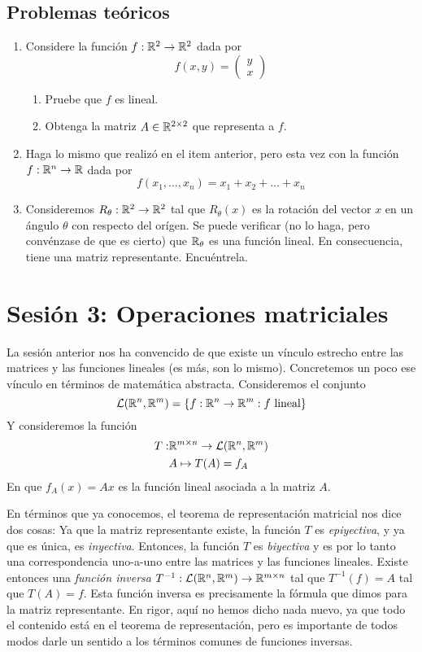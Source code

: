 \subsection{Problemas teóricos}

\begin{enumerate}
    \item Considere la función $f: \mathbb{R}^2 \to \mathbb{R}^2$ dada por
    \[f(x, y) = \begin{pmatrix}
        y \\ x
    \end{pmatrix}\]
    \begin{enumerate}
        \item Pruebe que $f$ es lineal.
        \item Obtenga la matriz $A \in \mathbb{R}^{2 \times 2}$ que representa a $f$.
    \end{enumerate}
    \item Haga lo mismo que realizó en el item anterior, pero esta vez con la función $f: \mathbb{R}^n \to \mathbb{R}$ dada por
    \[f(x_1, \dots , x_n) = x_1 + x_2 + \dots + x_n\]
    \item Consideremos $R_\theta : \mathbb{R}^2 \to \mathbb{R}^2$ tal que $R_\theta (x)$ es la rotación del vector $x$ en un ángulo $\theta$ con respecto del orígen. Se puede verificar (no lo haga, pero convénzase de que es cierto) que $\mathbb{R}_\theta$ es una función lineal. En consecuencia, tiene una matriz representante. Encuéntrela.
\end{enumerate}

\section{Sesión 3: Operaciones matriciales}

La sesión anterior nos ha convencido de que existe un vínculo estrecho entre las matrices y las funciones lineales (es más, son lo mismo). Concretemos un poco ese vínculo en términos de matemática abstracta. Consideremos el conjunto
\[\mathcal{L}(\mathbb{R}^n, \mathbb{R}^m) = \{f : \mathbb{R}^n \to \mathbb{R}^m : f \text{ lineal}\}\]
Y consideremos la función
\begin{align*}
    T : &\mathbb{R}^{m \times n} \to \mathcal{L}(\mathbb{R}^n, \mathbb{R}^m) \\
        & A \mapsto T(A) = f_A
\end{align*}
En que $f_A(x) = Ax$ es la función lineal asociada a la matriz $A$.

En términos que ya conocemos, el teorema de representación matricial nos dice dos cosas: Ya que la matriz representante existe, la función $T$ es \textit{epiyectiva}, y ya que es única, es \textit{inyectiva}. Entonces, la función $T$ es \textit{biyectiva} y es por lo tanto una correspondencia uno-a-uno entre las matrices y las funciones lineales. Existe entonces una \textit{función inversa} $T^{-1}: \mathcal{L}(\mathbb{R}^n, \mathbb{R}^m) \to \mathbb{R}^{m \times n}$ tal que $T^{-1}(f) = A$ tal que $T(A) = f$. Esta función inversa es precisamente la fórmula que dimos para la matriz representante. En rigor, aquí no hemos dicho nada nuevo, ya que todo el contenido está en el teorema de representación, pero es importante de todos modos darle un sentido a los términos comunes de funciones inversas.

